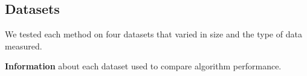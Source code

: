 

\subsection{Datasets}

We tested each method on four datasets that varied in size and the type of data measured.

\begin{table}
	\centering
	\caption[Dataset information]{
		\textbf{Information} about each dataset used to compare algorithm performance.
	}
	
	\label{tab:datasets}
\end{table}


